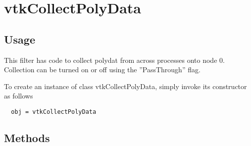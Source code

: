 \section{vtkCollectPolyData}

\subsection{Usage}

 This filter has code to collect polydat from across processes onto node 0.
 Collection can be turned on or off using the ''PassThrough'' flag.

To create an instance of class vtkCollectPolyData, simply
invoke its constructor as follows
\begin{verbatim}
  obj = vtkCollectPolyData
\end{verbatim}
\subsection{Methods}

